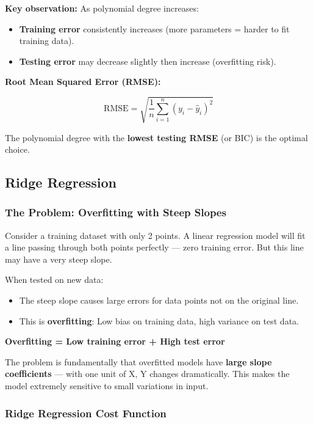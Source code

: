 \documentclass[12pt,openany]{book}
\begin{document}
\textbf{Key observation:} As polynomial degree increases:
\begin{itemize}[leftmargin=*]
    \item \textbf{Training error} consistently increases (more parameters = harder to fit training data).
    \item \textbf{Testing error} may decrease slightly then increase (overfitting risk).

\end{itemize}

\textbf{Root Mean Squared Error (RMSE):}

\[
\text{RMSE} = \sqrt{\frac{1}{n}\sum_{i=1}^{n}(y_i - \hat{y}_i)^2}
\]


The polynomial degree with the \textbf{lowest testing RMSE} (or BIC) is the optimal choice.

\medskip


\subsection{Ridge Regression}


\subsubsection{The Problem: Overfitting with Steep Slopes}


Consider a training dataset with only 2 points. A linear regression model will fit a line passing through both points perfectly --- zero training error. But this line may have a very steep slope.

When tested on new data:
\begin{itemize}[leftmargin=*]
    \item The steep slope causes large errors for data points not on the original line.
    \item This is \textbf{overfitting}: Low bias on training data, high variance on test data.

\end{itemize}

\textbf{Overfitting = Low training error + High test error}

The problem is fundamentally that overfitted models have \textbf{large slope coefficients} --- with one unit of X, Y changes dramatically. This makes the model extremely sensitive to small variations in input.

\subsubsection{Ridge Regression Cost Function}
\end{document}
